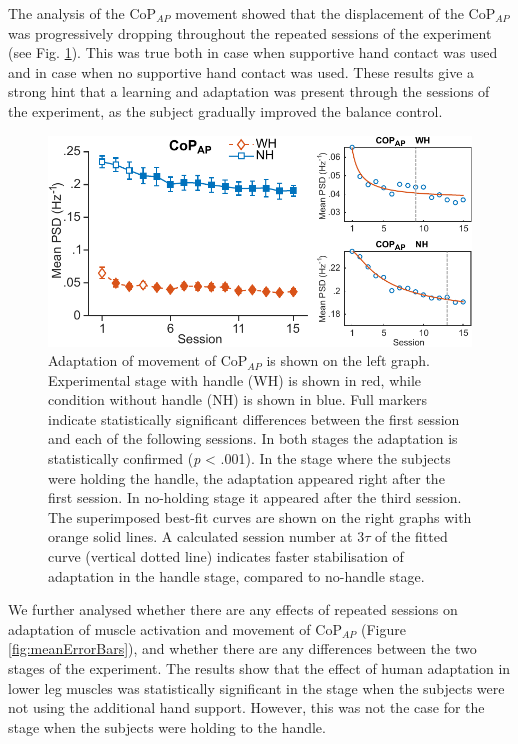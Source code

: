 The analysis of the CoP$_{AP}$ movement showed that the displacement of the CoP$_{AP}$ was progressively dropping throughout the repeated sessions of the experiment (see Fig. \ref{fig:COPapAndTau}). This was true both in case when supportive hand contact was used and in case when no supportive hand contact was used. These results give a strong hint that a learning and adaptation was present through the sessions of the experiment, as the subject gradually improved the balance control.

\begin{figure}[!t]
	\begin{center}
		\includegraphics[width=\linewidth]{images/COPapAndTau.pdf}
		\caption{Adaptation of movement of CoP$_{AP}$ is shown on the left graph. Experimental stage with handle (WH) is shown in red, while condition without handle (NH) is shown in blue. Full markers indicate statistically significant differences between the first session and each of the following sessions. In both stages the adaptation is statistically confirmed (\textit{p} < .001). In the stage where the subjects were holding the handle, the adaptation appeared right after the first session. In no-holding stage it appeared after the third session. The superimposed best-fit curves are shown on the right graphs with orange solid lines. A calculated session number at 3$\tau$ of the fitted curve (vertical dotted line) indicates faster stabilisation of adaptation in the handle stage, compared to no-handle stage.}
		\label{fig:COPapAndTau}
	\end{center}
\end{figure}

We further analysed whether there are any effects of repeated sessions on adaptation of muscle activation and movement of CoP$_{AP}$ (Figure \ref{fig:meanErrorBars}), and whether there are any differences between the two stages of the experiment. The results show that the effect of human adaptation in lower leg muscles was statistically significant in the stage when the subjects were not using the additional hand support. However, this was not the case for the stage when the subjects were holding to the handle.

